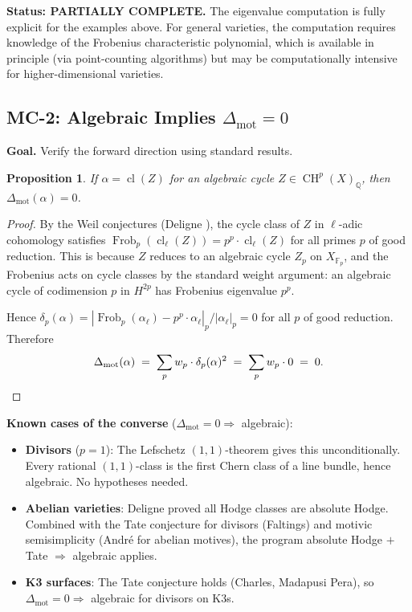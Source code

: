\documentclass[11pt]{article}
\newtheorem{proposition}[theorem]{Proposition}
\theoremstyle{definition}
\DeclareMathOperator{\cl}{cl}
\DeclareMathOperator{\Frob}{Frob}
\DeclareMathOperator{\CH}{CH}
\begin{document}
\textbf{Status: PARTIALLY COMPLETE.}  The eigenvalue computation is fully
explicit for the examples above.  For general varieties, the computation
requires knowledge of the Frobenius characteristic polynomial, which is
available in principle (via point-counting algorithms) but may be
computationally intensive for higher-dimensional varieties.

\subsection{MC-2: Algebraic Implies $\Delta_{\mathrm{mot}} = 0$}
\label{sec:mc2}

\textbf{Goal.}  Verify the forward direction using standard results.

\begin{proposition}
\label{prop:mc2}
If $\alpha = \cl(Z)$ for an algebraic cycle $Z \in \CH^p(X)_{\mathbb{Q}}$,
then $\Delta_{\mathrm{mot}}(\alpha) = 0$.
\end{proposition}

\begin{proof}
By the Weil conjectures (Deligne \cite{Deligne-Weil}), the cycle class
of $Z$ in $\ell$-adic cohomology satisfies
$\Frob_p(\cl_\ell(Z)) = p^p \cdot \cl_\ell(Z)$ for all primes $p$ of good
reduction.  This is because $Z$ reduces to an algebraic cycle
$Z_p$ on $X_{\mathbb{F}_p}$, and the Frobenius acts on cycle classes by
the standard weight argument: an algebraic cycle of codimension $p$
in $H^{2p}$ has Frobenius eigenvalue $p^p$.

Hence $\delta_p(\alpha) = |\Frob_p(\alpha_\ell) - p^p \cdot \alpha_\ell|_p
/ |\alpha_\ell|_p = 0$ for all $p$ of good reduction.  Therefore
\[
  \Delta_{\mathrm{mot}}(\alpha) \;=\; \sum_{p} w_p \cdot \delta_p(\alpha)^2
  \;=\; \sum_{p} w_p \cdot 0 \;=\; 0. \qedhere
\]
\end{proof}

\noindent\textbf{Known cases of the converse}
($\Delta_{\mathrm{mot}} = 0 \Rightarrow$ algebraic):

\begin{itemize}
  \item \textbf{Divisors} ($p = 1$): The Lefschetz $(1,1)$-theorem gives
    this unconditionally.  Every rational $(1,1)$-class is the first Chern
    class of a line bundle, hence algebraic.  No hypotheses needed.
  \item \textbf{Abelian varieties}: Deligne proved all Hodge classes are
    absolute Hodge.  Combined with the Tate conjecture for divisors
    (Faltings) and motivic semisimplicity (Andr\'e for abelian motives),
    the program absolute Hodge $+$ Tate $\Rightarrow$ algebraic applies.
  \item \textbf{K3 surfaces}: The Tate conjecture holds (Charles, Madapusi
    Pera), so $\Delta_{\mathrm{mot}} = 0 \Rightarrow$ algebraic for
    divisors on K3s.
\end{itemize}
\end{document}
